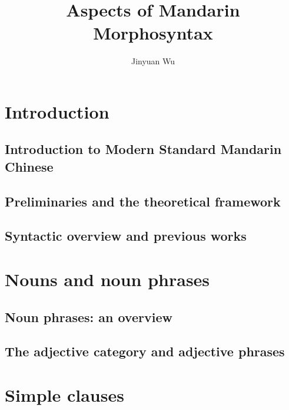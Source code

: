 \documentclass[UTF8, a4paper, oneside, scheme=plain]{ctexbook}
\title{Aspects of Mandarin Morphosyntax}
\author{Jinyuan Wu}
\numberwithin{equation}{chapter}
\begin{document}
\maketitle

\automath

\part{Introduction}

\chapter{Introduction to Modern Standard Mandarin Chinese}



\chapter{Preliminaries and the theoretical framework}\label{chap:theory}



\chapter{Syntactic overview and previous works}



\part{Nouns and noun phrases}

\chapter{Noun phrases: an overview}



\chapter{The adjective category and adjective phrases}



\part{Simple clauses}
\end{document}
